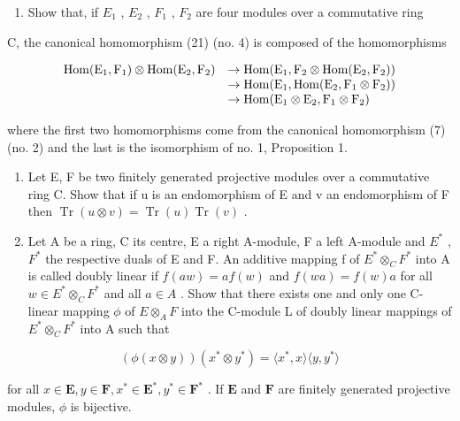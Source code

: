 \begin{enumerate}
\def\labelenumi{\arabic{enumi}.}
\setcounter{enumi}{6}
\tightlist
\item
  Show that, if \(E_{1}\) , \(E_{2}\) , \(F_{1}\) , \(F_{2}\) are four modules over a commutative ring
\end{enumerate}

C, the canonical homomorphism (21) (no. 4) is composed of the homomorphisms

\[
\begin{array}{r l} \operatorname{Hom} (\mathrm{E} _ {1}, \mathrm{F} _ {1}) \otimes \operatorname{Hom} (\mathrm{E} _ {2}, \mathrm{F} _ {2}) & \to \operatorname{Hom} (\mathrm{E} _ {1}, \mathrm{F} _ {2} \otimes \operatorname{Hom} (\mathrm{E} _ {2}, \mathrm{F} _ {2})) \\ & \to \operatorname{Hom} (\mathrm{E} _ {1}, \operatorname{Hom} (\mathrm{E} _ {2}, \mathrm{F} _ {1} \otimes \mathrm{F} _ {2})) \\ & \to \operatorname{Hom} (\mathrm{E} _ {1} \otimes \mathrm{E} _ {2}, \mathrm{F} _ {1} \otimes \mathrm{F} _ {2}) \end{array}
\]

where the first two homomorphisms come from the canonical homomorphism (7) (no. 2) and the last is the isomorphism of no. 1, Proposition 1.

\begin{enumerate}
\def\labelenumi{\arabic{enumi}.}
\setcounter{enumi}{7}
\item
  Let E, F be two finitely generated projective modules over a commutative ring C. Show that if u is an endomorphism of E and v an endomorphism of F then \(\operatorname{Tr}(u \otimes v) = \operatorname{Tr}(u)\operatorname{Tr}(v)\) .
\item
  Let A be a ring, C its centre, E a right A-module, F a left A-module and \(E^{*}\) , \(F^{*}\) the respective duals of E and F. An additive mapping f of \(E^{*} \otimes_{C} F^{*}\) into A is called doubly linear if \(f(aw) = af(w)\) and \(f(wa) = f(w)a\) for all \(w \in E^{*} \otimes_{C} F^{*}\) and all \(a \in A\) . Show that there exists one and only one C-linear mapping \(\phi\) of \(E \otimes_{A} F\) into the C-module L of doubly linear mappings of \(E^{*} \otimes_{C} F^{*}\) into A such that
\end{enumerate}

\[
(\phi (x \otimes y)) (x ^ {*} \otimes y ^ {*}) = \langle x ^ {*}, x \rangle \langle y, y ^ {*} \rangle
\]

for all \(x \in \mathbf{E}, y \in \mathbf{F}, x^{*} \in \mathbf{E}^{*}, y^{*} \in \mathbf{F}^{*}\) . If \(\mathbf{E}\) and \(\mathbf{F}\) are finitely generated projective modules, \(\phi\) is bijective.

